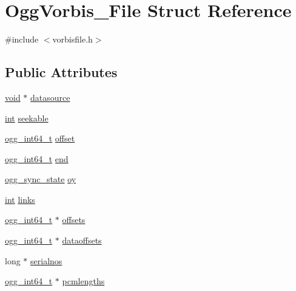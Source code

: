 \hypertarget{struct_ogg_vorbis___file}{}\section{Ogg\+Vorbis\+\_\+\+File Struct Reference}
\label{struct_ogg_vorbis___file}


{\ttfamily \#include $<$vorbisfile.\+h$>$}

\subsection*{Public Attributes}
\begin{DoxyCompactItemize}
\item 
\hyperlink{sound_8c_ae35f5844602719cf66324f4de2a658b3}{void} $\ast$ \hyperlink{struct_ogg_vorbis___file_a46afb3dcc7aac5917573e41d7504c0d6}{datasource}
\item 
\hyperlink{xmltok_8h_a5a0d4a5641ce434f1d23533f2b2e6653}{int} \hyperlink{struct_ogg_vorbis___file_a2a390c4f15c0d1fe0cf9c90fd0bae087}{seekable}
\item 
\hyperlink{config__types_8h_a292432ede703993aa88db876e11b2306}{ogg\+\_\+int64\+\_\+t} \hyperlink{struct_ogg_vorbis___file_a36f8f9f012cd2e7ab8cb395b787376cb}{offset}
\item 
\hyperlink{config__types_8h_a292432ede703993aa88db876e11b2306}{ogg\+\_\+int64\+\_\+t} \hyperlink{struct_ogg_vorbis___file_ae56eb8bc78d2fc27c79d145a7c80a681}{end}
\item 
\hyperlink{structogg__sync__state}{ogg\+\_\+sync\+\_\+state} \hyperlink{struct_ogg_vorbis___file_ae35fa1e6f99edcb104566301324ecf94}{oy}
\item 
\hyperlink{xmltok_8h_a5a0d4a5641ce434f1d23533f2b2e6653}{int} \hyperlink{struct_ogg_vorbis___file_ad41f80ffaa6b48a14addef0a02639a87}{links}
\item 
\hyperlink{config__types_8h_a292432ede703993aa88db876e11b2306}{ogg\+\_\+int64\+\_\+t} $\ast$ \hyperlink{struct_ogg_vorbis___file_af9fe0ece4ff98e207682731b36951920}{offsets}
\item 
\hyperlink{config__types_8h_a292432ede703993aa88db876e11b2306}{ogg\+\_\+int64\+\_\+t} $\ast$ \hyperlink{struct_ogg_vorbis___file_af797824fb6e98c0248c19e6909dd680e}{dataoffsets}
\item 
long $\ast$ \hyperlink{struct_ogg_vorbis___file_abd5a9adc78abd620ce2c63bd153df150}{serialnos}
\item 
\hyperlink{config__types_8h_a292432ede703993aa88db876e11b2306}{ogg\+\_\+int64\+\_\+t} $\ast$ \hyperlink{struct_ogg_vorbis___file_a88a4e6a4ec6c9837d44e6cc0c864679e}{pcmlengths}

\end{DoxyCompactItemize}
